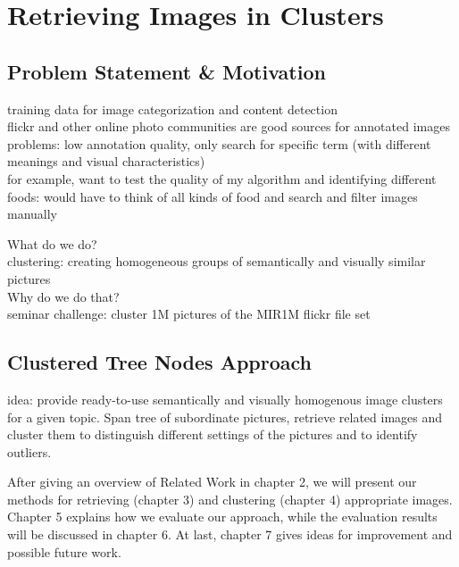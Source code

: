 \section{Retrieving Images in Clusters}
\label{sec_introduction}


\subsection{Problem Statement \& Motivation}
training data for image categorization and content detection \\
flickr and other online photo communities are good sources for annotated images \\
problems: low annotation quality, only search for specific term (with different meanings and visual characteristics) \\
for example, want to test the quality of my algorithm and identifying different foods: would have to think of all kinds of food and search and filter images manually

What do we do? \\
clustering: creating homogeneous groups of semantically and visually similar pictures \\

Why do we do that? \\
seminar challenge: cluster 1M pictures of the MIR1M flickr file set \\

\subsection{Clustered Tree Nodes Approach}
idea: provide ready-to-use semantically and visually homogenous image clusters for a given topic. Span tree of subordinate pictures, retrieve related images and cluster them to distinguish different settings of the pictures and to identify outliers.

\bigskip

After giving an overview of Related Work in chapter 2, we will present our methods for retrieving (chapter 3) and clustering (chapter 4) appropriate images. Chapter 5 explains how we evaluate our approach, while the evaluation results will be discussed in chapter 6. At last, chapter 7 gives ideas for improvement and possible future work.
